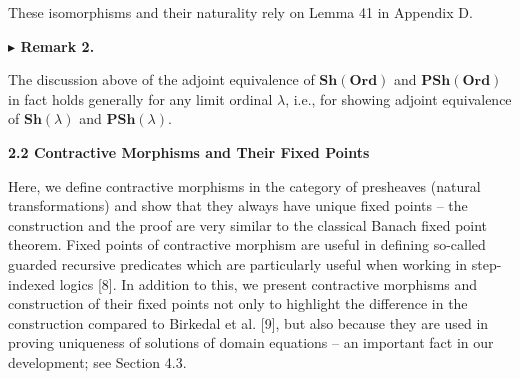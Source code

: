 \begin{center}\end{center}
 
These isomorphisms and their naturality rely on Lemma 41 in Appendix D.\par
 
 
 
\par\medskip\noindent\textbf{$\blacktriangleright$ Remark 2.}\par
 
 
The discussion above of the adjoint equivalence of $\mathbf{Sh}(\mathbf{Ord})$ and $\mathbf{PSh}(\mathbf{Ord})$ in fact holds generally for any limit ordinal $\lambda$, i.e., for showing adjoint equivalence of $\mathbf{Sh}(\lambda)$ and $\mathbf{PSh}(\lambda)$.\par
 
 
 
 
 
\par\medskip\noindent\textbf{2.2 Contractive Morphisms and Their Fixed Points}\par
 
 
Here, we define contractive morphisms in the category of presheaves (natural transformations) and show that they always have unique fixed points – the construction and the proof are very similar to the classical Banach fixed point theorem. Fixed points of contractive morphism are useful in defining so-called guarded recursive predicates which are particularly useful when working in step-indexed logics [8]. In addition to this, we present contractive morphisms and construction of their fixed points not only to highlight the difference in the construction compared to Birkedal et al. [9], but also because they are used in proving uniqueness of solutions of domain equations – an important fact in our development; see Section 4.3.\par
 
